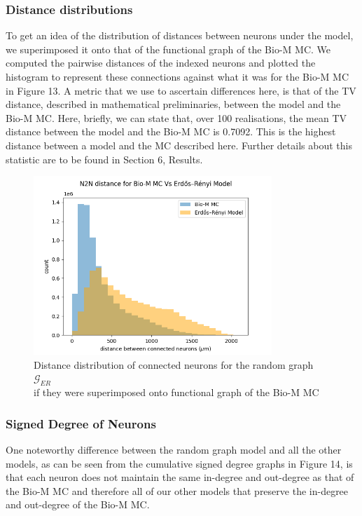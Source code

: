 \subsubsection{Distance distributions}
To get an idea of the distribution of distances between neurons under the \ER model, we superimposed it onto that of the functional graph of the Bio-M MC. We computed the pairwise distances of the indexed neurons and plotted the histogram to represent these connections against what it was for the Bio-M MC in Figure 13. A metric that we use to ascertain differences here, is that of the TV distance, described in mathematical preliminaries, between the \ER model and the Bio-M MC. Here, briefly, we can state that, over 100 realisations, the mean TV distance between the \ER model and the Bio-M MC is 0.7092. This is the highest distance between a model and the MC described here. Further details about this statistic are to be found in Section 6, Results.
\begin{figure}[H]
\begin{center}
\captionsetup{justification=centering}
\includegraphics[width=9cm]{ER/Erdos_Renyi_dist_distr.png}
\caption{Distance distribution of connected neurons for the random graph $\mathcal{G}_{ER}$ \\if they were superimposed onto functional graph of the Bio-M MC}
\end{center}
\end{figure}

\subsubsection{Signed Degree of Neurons}
One noteworthy difference between the \ER random graph model and all the other models, as can be seen from the cumulative signed degree graphs in Figure 14, is that each neuron does not maintain the same in-degree and out-degree as that of the Bio-M MC and therefore all of our other models that preserve the in-degree and out-degree of the Bio-M MC. 

